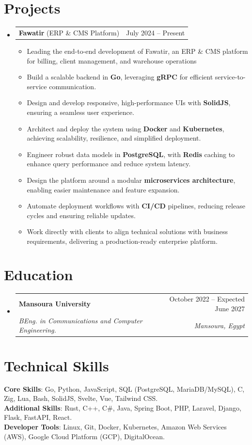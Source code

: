 \documentclass[letterpaper,11pt]{article}
\makeatletter
\newcommand{\resumeItem}[1]{
	\item\small{{#1 \vspace{-2pt}}}
}
\newcommand{\resumeSubHeading}[4]{
	\vspace{-2pt}\item
	\begin{tabular*}{0.97\textwidth}[t]{l@{\extracolsep{\fill}}r}
		\textbf{#1} & #2 \\
		\textit{\small#3} & \textit{\small #4} \\
	\end{tabular*}\vspace{-7pt}
}
\newcommand{\resumeProjectHeading}[2]{
	\item
	\begin{tabular*}{0.97\textwidth}{l@{\extracolsep{\fill}}r}
		\small#1 & #2 \\
	\end{tabular*}\vspace{-7pt}
}
\newcommand{\resumeSubHeadingListStart}{\begin{itemize}[leftmargin=0.15in, label={}]}
\newcommand{\resumeSubHeadingListEnd}{\end{itemize}}
\newcommand{\resumeItemListStart}{\begin{itemize}}
\newcommand{\resumeItemListEnd}{\end{itemize}\vspace{-5pt}}
\makeatother
\begin{document}
\section{Projects}
\resumeSubHeadingListStart
\resumeProjectHeading
	{\textbf{Fawatir} (ERP \& CMS Platform)}{July 2024 -- Present}
	\resumeItemListStart
		\resumeItem{Leading the end-to-end development of Fawatir, an ERP \& CMS platform for billing, client management, and warehouse operations}
		\resumeItem{Build a scalable backend in \textbf{Go}, leveraging \textbf{gRPC} for efficient service-to-service communication.}
		\resumeItem{Design and develop responsive, high-performance UIs with \textbf{SolidJS}, ensuring a seamless user experience.}
		\resumeItem{Architect and deploy the system using \textbf{Docker} and \textbf{Kubernetes}, achieving scalability, resilience, and simplified deployment.}
		\resumeItem{Engineer robust data models in \textbf{PostgreSQL}, with \textbf{Redis} caching to enhance query performance and reduce system latency.}
		\resumeItem{Design the platform around a modular \textbf{microservices architecture}, enabling easier maintenance and feature expansion.}
		\resumeItem{Automate deployment workflows with \textbf{CI/CD} pipelines, reducing release cycles and ensuring reliable updates.}
		\resumeItem{Work directly with clients to align technical solutions with business requirements, delivering a production-ready enterprise platform.}
	\resumeItemListEnd
\resumeSubHeadingListEnd

\section{Education}
\resumeSubHeadingListStart
	\resumeSubHeading
		{Mansoura University}{October 2022 -- Expected June 2027}
		{BEng. in Communications and Computer Engineering.}{Mansoura, Egypt}
\resumeSubHeadingListEnd

\section{Technical Skills}
\begin{itemize}[leftmargin=0.15in, label={}]
	\small{\item{
		\textbf{Core Skills}{: Go, Python, JavaScript, SQL (PostgreSQL, MariaDB/MySQL), C, Zig, Lua, Bash, SolidJS, Svelte, Vue, Tailwind CSS.} \\
		\textbf{Additional Skills}{: Rust, C++, C\#, Java, Spring Boot, PHP, Laravel, Django, Flask, FastAPI, React.} \\
		\textbf{Developer Tools}{: Linux, Git, Docker, Kubernetes, Amazon Web Services (AWS), Google Cloud Platform (GCP), DigitalOcean.} \\
	}}
\end{itemize}
\end{document}
